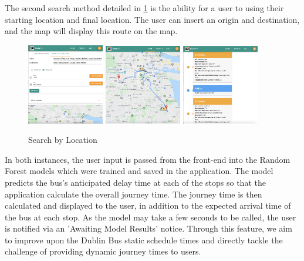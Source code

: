 \documentclass[]{UCD_CS_47360_Report}
\begin{document}
The second search method detailed in \ref{fig:SearchByLocation} is the ability for a user to using their starting location and final location. The user can insert an origin and destination, and the map will display this route on the map.
\begin{figure}[!htb]
    \centering
    \includegraphics[width=0.3\textwidth]{figures/2_2_Search_By_Location_1.png}
    \includegraphics[width=0.3\textwidth]{figures/2_2_Map_View_2.png}
    \includegraphics[width=0.3\textwidth]{figures/2_2_Search_By_Location_2.png}
    \caption{Search by Location}
    \label{fig:SearchByLocation}
\end{figure}

In both instances, the user input is passed from the front-end into the Random Forest models which were trained and saved in the application. The model predicts the bus's anticipated delay time at each of the stops so that the application calculate the overall journey time. The journey time is then calculated and displayed to the user, in addition to the expected arrival time of the bus at each stop. As the model may take a few seconds to be called, the user is notified via an 'Awaiting Model Results' notice. Through this feature, we aim to improve upon the Dublin Bus static schedule times and directly tackle the challenge of providing dynamic journey times to users.
\end{document}
